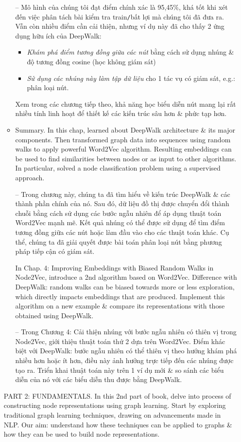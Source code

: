 \documentclass{article}
\begin{document}
\begin{itemize}
\begin{itemize}
        -- Mô hình của chúng tôi đạt điểm chính xác là 95,45\%, khá tốt khi xét đến việc phân tách bài kiểm tra train{\tt/}bất lợi mà chúng tôi đã đưa ra. Vẫn còn nhiều điểm cần cải thiện, nhưng ví dụ này đã cho thấy 2 ứng dụng hữu ích của DeepWalk:
        \begin{itemize}
            \item {\it Khám phá điểm tương đồng giữa các nút} bằng cách sử dụng nhúng \& độ tương đồng cosine (học không giám sát)
            \item {\it Sử dụng các nhúng này làm tập dữ liệu} cho 1 tác vụ có giám sát, e.g.: phân loại nút.
        \end{itemize}
        Xem trong các chương tiếp theo, khả năng học biểu diễn nút mang lại rất nhiều tính linh hoạt để thiết kế các kiến trúc sâu hơn \& phức tạp hơn.
        \item {\sf Summary.} In this chap, learned about DeepWalk architecture \& its major components. Then transformed graph data into sequences using random walks to apply powerful Word2Vec algorithm. Resulting embeddings can be used to find similarities between nodes or as input to other algorithms. In particular, solved a node classification problem using a supervised approach.

        -- Trong chương này, chúng ta đã tìm hiểu về kiến trúc DeepWalk \& các thành phần chính của nó. Sau đó, dữ liệu đồ thị được chuyển đổi thành chuỗi bằng cách sử dụng các bước ngẫu nhiên để áp dụng thuật toán Word2Vec mạnh mẽ. Kết quả nhúng có thể được sử dụng để tìm điểm tương đồng giữa các nút hoặc làm đầu vào cho các thuật toán khác. Cụ thể, chúng ta đã giải quyết được bài toán phân loại nút bằng phương pháp tiếp cận có giám sát.

        In Chap. 4: Improving Embeddings with Biased Random Walks in Node2Vec, introduce a 2nd algorithm based on Word2Vec. Difference with DeepWalk: random walks can be biased towards more or less exploration, which directly impacts embeddings that are produced. Implement this algorithm on a new example \& compare its representations with those obtained using DeepWalk.

        -- Trong Chương 4: Cải thiện nhúng với bước ngẫu nhiên có thiên vị trong Node2Vec, giới thiệu thuật toán thứ 2 dựa trên Word2Vec. Điểm khác biệt với DeepWalk: bước ngẫu nhiên có thể thiên vị theo hướng khám phá nhiều hơn hoặc ít hơn, điều này ảnh hưởng trực tiếp đến các nhúng được tạo ra. Triển khai thuật toán này trên 1 ví dụ mới \& so sánh các biểu diễn của nó với các biểu diễn thu được bằng DeepWalk.
    \end{itemize}
    PART 2: FUNDAMENTALS. In this 2nd part of book, delve into process of constructing node representations using graph learning. Start by exploring traditional graph learning techniques, drawing on advancements made in NLP. Our aim: understand how these techniques can be applied to graphs \& how they can be used to build node representations.


\end{itemize}
\end{document}
